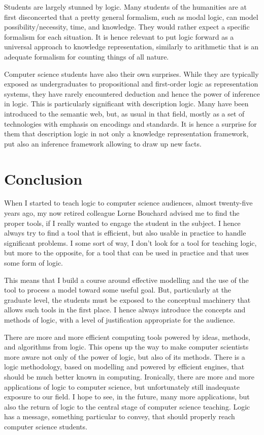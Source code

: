 \documentclass[a4paper,UKenglish]{lipics}
\begin{document}
Students are largely stunned by logic. Many students of the humanities are at first disconcerted that a pretty general formalism, such as modal logic, can model possibility/necessity, time, and knowledge. They would rather expect a specific formalism for each situation. It is hence relevant to put logic forward as a universal approach to knowledge representation, similarly to arithmetic that is an adequate formalism for counting things of all nature.

Computer science students have also their own surprises. While they are typically exposed as undergraduates to propositional and first-order logic as representation systems, they have rarely encountered deduction and hence the power of inference in logic. This is particularly significant with description logic. Many have been introduced to the semantic web, but, as usual in that field, mostly as a set of technologies with emphasis on encodings and standards. It is hence a surprise for them that description logic in not only a knowledge representation framework, put also an inference framework allowing to draw up new facts.

\section{Conclusion}\label{SECCON}
When I started to teach logic to computer science audiences, almost twenty-five years ago, my now retired colleague Lorne Bouchard advised me to find the proper tools, if I really wanted to engage the student in the subject. I hence always try to find a tool that is efficient, but also usable in practice to handle significant problems. I some sort of way, I don't look for a tool for teaching logic, but more to the opposite, for a tool that can be used in practice and that uses some form of logic.

This means that I build a course around effective modelling and the use of the tool to process a model toward some useful goal. But, particularly at the graduate level, the students must be exposed to the conceptual machinery that allows such tools in the first place. I hence always introduce the concepts and methods of logic, with a level of justification appropriate for the audience.

There are more and more efficient computing tools powered by ideas, methods, and algorithms from logic. This opens up the way to make computer scientists more aware not only of the power of logic, but also of its methods. There is a logic methodology, based on modelling and powered by efficient engines, that should be much better known in computing. Ironically, there are more and more applications of logic to computer science, but unfortunately still inadequate exposure to our field. I hope to see, in the future, many more applications, but also the return of logic to the central stage of computer science teaching. Logic has a message, something particular to convey, that should properly reach computer science students.
\end{document}
